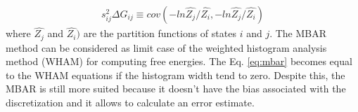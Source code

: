 \begin{equation}
\label{eq:varmbar}
\begin{aligned}
 s_{ij}^{2} \Delta G_{ij} \equiv cov (-ln \hat{Z_{j}}/\hat{Z_{i}},-ln \hat{Z_{j}}/\hat{Z_{i}})
\end{aligned}
\end{equation}
where $\hat{Z_{j}}$ and $\hat{Z_{i}})$ are the partition functions of states $i$ and $j$. The MBAR method can be considered as limit case of the 
weighted histogram analysis method (WHAM) \cite{wham} for computing free energies. The Eq. \eqref{eq:mbar} becomes equal to the WHAM equations if the histogram width tend to zero. Despite this, the MBAR is still more suited because it doesn't have the bias associated with the discretization  and it allows to calculate an error estimate.
